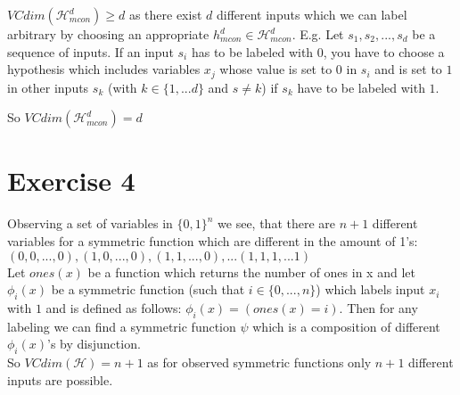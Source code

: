 \documentclass{article}
\begin{document}
$VCdim(\mathcal{H}_{mcon}^d) \geq d$ as
there exist $d$ different inputs which we can label arbitrary by choosing an appropriate $h_{mcon}^d \in \mathcal{H}_{mcon}^d$. E.g. Let $s_1, s_2, ..., s_{d}$ be a sequence of inputs. If an input $s_i$ has to be labeled with $0$, you have to choose a hypothesis which includes variables $x_j$ whose value is set to $0$ in $s_i$ and is set to $1$ in other inputs $s_k$ (with $k \in \{1, ... d\}$ and $s\neq k$) if $s_k$ have to be labeled with $1$.

So $VCdim(\mathcal{H}_{mcon}^d) = d$ 



\section*{Exercise 4}
Observing a set of variables in $\{0,1\}^n$ we see, that there are $n+1$ different variables for a symmetric function which are different in the amount of 1's: \\ ${(0,0,..., 0), (1,0,..., 0), (1,1,..., 0), ... (1,1,1, ... 1)}$ \\
Let $ones(x)$ be a function which returns the number of ones in x and let $\phi_i(x)$ be a symmetric function (such that $i\in\{0,..., n\}$) which labels input $x_i$ with $1$ and is defined as follows:
$\phi_i(x) = (ones(x) = i)$.
Then for any labeling we can find a symmetric function $\psi$ which is a composition of different  $\phi_i(x)$'s by disjunction. \\
So $VCdim(\mathcal{H}) = n+1$ as for observed symmetric functions only $n+1$ different inputs are possible.
\end{document}

